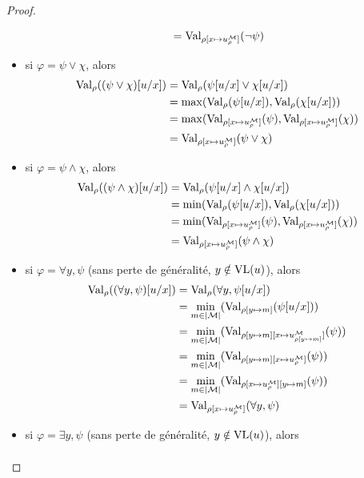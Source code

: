 \begin{proof}
\begin{itemize}
\begin{align*}
      &= \operatorname{Val}_{\rho[x\mapsto u^\mathcal M_\rho]}(\lnot\psi)\\
    \end{align*}
  \item si $\varphi = \psi \lor \chi$, alors
    \begin{align*}
      \operatorname{Val}_\rho((\psi \lor \chi)[u/x]) &= \operatorname{Val}_\rho(\psi[u/x] \lor \chi[u/x])\\
      &= \max (\operatorname{Val}_\rho(\psi[u/x]),\operatorname{Val}_\rho(\chi[u/x]))\\
      &= \max (\operatorname{Val}_{\rho[x\mapsto u^\mathcal M_\rho]}(\psi),
      \operatorname{Val}_{\rho[x \mapsto u^\mathcal M_\rho]}(\chi))\\
      &= \operatorname{Val}_{\rho[x\mapsto u^\mathcal M_\rho]}(\psi\lor \chi)
    \end{align*}
  \item si $\varphi = \psi \land \chi$, alors
    \begin{align*}
      \operatorname{Val}_\rho((\psi \land \chi)[u/x]) &= \operatorname{Val}_\rho(\psi[u/x] \land \chi[u/x])\\
      &= \min (\operatorname{Val}_\rho(\psi[u/x]),\operatorname{Val}_\rho(\chi[u/x]))\\
      &= \min (\operatorname{Val}_{\rho[x\mapsto u^\mathcal M_\rho]}(\psi),
      \operatorname{Val}_{\rho[x \mapsto u^\mathcal M_\rho]}(\chi))\\
      &= \operatorname{Val}_{\rho[x\mapsto u^\mathcal M_\rho]}(\psi\land \chi)
    \end{align*}
  \item si $\varphi = \forall y, \psi$ (sans perte de généralité,
    $y\notin \operatorname{VL}(u)$), alors
    \begin{align*}
      \operatorname{Val}_\rho((\forall y,\psi)[u/x]) &= \operatorname{Val}_\rho(\forall y,\psi[u/x])\\
      &= \min_{m\in|\mathcal M|}(\operatorname{Val}_{\rho[y \mapsto m]}(\psi[u/x]))\\
      &= \min_{m\in|\mathcal M|}(\operatorname{Val}_{\rho[y\mapsto m]
        [x\mapsto u^\mathcal M_{\rho[y\mapsto m]}]}(\psi))\\
      &= \min_{m\in|\mathcal M|}(\operatorname{Val}_{\rho[y\mapsto m][x\mapsto u^\mathcal M_\rho]}(\psi))\\
      &= \min_{m\in|\mathcal M|}(\operatorname{Val}_{\rho[x\mapsto u^\mathcal M_\rho][y\mapsto m]}(\psi))\\
      &= \operatorname{Val}_{\rho[x\mapsto u^\mathcal M_\rho]}(\forall y, \psi)
    \end{align*}
  \item si $\varphi = \exists y, \psi$ (sans perte de généralité,
    $y\notin \operatorname{VL}(u)$), alors
    \begin{align*}

\end{align*}
\end{itemize}
\end{proof}

